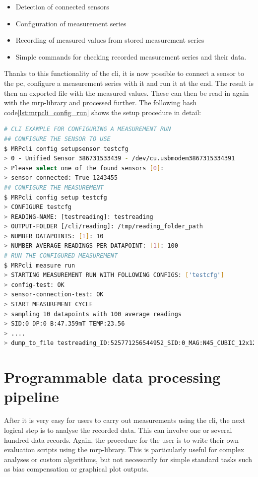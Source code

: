 \begin{itemize}
\tightlist
\item
  Detection of connected sensors
\item
  Configuration of measurement series
\item
  Recording of measured values from stored measurement series
\item
  Simple commands for checking recorded measurement series and their
  data.
\end{itemize}

Thanks to this functionality of the \gls{cli}, it is now possible to
connect a sensor to the \gls{pc}, configure a measurement series with it
and run it at the end. The result is then an exported file with the
measured values. These can then be read in again with the
\gls{mrp}-library and processed further. The following bash
code\ref{lst:mrpcli_config_run} shows the setup procedure in detail:

\begin{lstlisting}[language=bash, caption={CLI example for configuring a measurement run}, label=lst:mrpcli_config_run]
# CLI EXAMPLE FOR CONFIGURING A MEASUREMENT RUN
## CONFIGURE THE SENSOR TO USE
$ MRPcli config setupsensor testcfg
> 0 - Unified Sensor 386731533439 - /dev/cu.usbmodem3867315334391
> Please select one of the found sensors [0]:
> sensor connected: True 1243455
## CONFIGURE THE MEASUREMENT
$ MRPcli config setup testcfg
> CONFIGURE testcfg
> READING-NAME: [testreading]: testreading
> OUTPUT-FOLDER [/cli/reading]: /tmp/reading_folder_path
> NUMBER DATAPOINTS: [1]: 10
> NUMBER AVERAGE READINGS PER DATAPOINT: [1]: 100
# RUN THE CONFIGURED MEASUREMENT
$ MRPcli measure run
> STARTING MEASUREMENT RUN WITH FOLLOWING CONFIGS: ['testcfg']
> config-test: OK
> sensor-connection-test: OK
> START MEASUREMENT CYCLE
> sampling 10 datapoints with 100 average readings
> SID:0 DP:0 B:47.359mT TEMP:23.56
> ....
> dump_to_file testreading_ID:525771256544952_SID:0_MAG:N45_CUBIC_12x12x12.mag.json
\end{lstlisting}

\hypertarget{programmable-data-processing-pipeline}{%
\section{Programmable data processing
pipeline}\label{programmable-data-processing-pipeline}}

After it is very easy for users to carry out measurements using the
\gls{cli}, the next logical step is to analyse the recorded data. This
can involve one or several hundred data records. Again, the procedure
for the user is to write their own evaluation scripts using the
\gls{mrp}-library. This is particularly useful for complex analyses or
custom algorithms, but not necessarily for simple standard tasks such as
bias compensation or graphical plot outputs.

